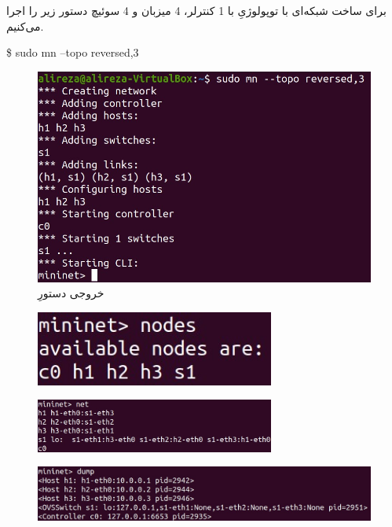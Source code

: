 \documentclass{article}
\begin{document}
\subsubsection{}
برای ساخت شبکه‌ای با توپولوژیِ  با 1 کنترلر، 4 میزبان و 4 سوئیچ دستور زیر را اجرا می‌کنیم.
\begin{latin}
\$ sudo mn --topo reversed,3
\end{latin}
\begin{figure}[H]
    \centering
    \includegraphics[width=1.0\textwidth]{figures/3f.jpg}
    \caption
	{
خروجی دستورِ 
	}
    \label{fig:fig1}
\end{figure}
\begin{figure}[H]
    \centering
    \includegraphics[width=0.7\textwidth]{figures/3f1.jpg}
    \caption
	{
	}
    \label{fig:fig1}
\end{figure}
\begin{figure}[H]
    \centering
    \includegraphics[width=0.7\textwidth]{figures/3f2.jpg}
    \caption
	{
	}
    \label{fig:fig1}
\end{figure}
\begin{figure}[H]
    \centering
    \includegraphics[width=1.0\textwidth]{figures/3f3.jpg}
    \caption
	{
	}
    \label{fig:fig1}
\end{figure}
\end{document}
